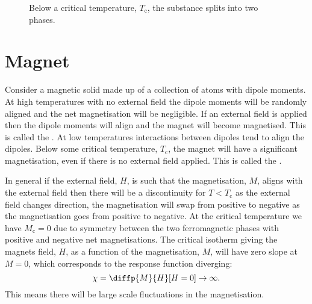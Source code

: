 \documentclass[fleqn]{NotesClass}
\begin{document}
    \begin{figure}
        \caption{Below a critical temperature, \(T_{\mathrm{c}}\), the substance splits into two phases.}
    \end{figure}
    
    \section{Magnet}
    Consider a magnetic solid made up of a collection of atoms with dipole moments.
    At high temperatures with no external field the dipole moments will be randomly aligned and the net magnetisation will be negligible.
    If an external field is applied then the dipole moments will align and the magnet will become magnetised.
    This is called the .
    At low temperatures interactions between dipoles tend to align the dipoles.
    Below some critical temperature, \(T_{\mathrm{c}}\), the magnet will have a significant magnetisation, even if there is no external field applied.
    This is called the .
    
    In general if the external field, \(H\), is such that the magnetisation, \(M\), aligns with the external field then there will be a discontinuity for \(T < T_{\mathrm{c}}\) as the external field changes direction, the magnetisation will swap from positive to negative as the magnetisation goes from positive to negative.
    At the critical temperature we have \(M_{\mathrm{c}} = 0\) due to symmetry between the two ferromagnetic phases with positive and negative net magnetisations.
    The critical isotherm giving the magnets field, \(H\), as a function of the magnetisation, \(M\), will have zero slope at \(M = 0\), which corresponds to the response function diverging:
    \begin{equation}
        \chi = \diffp{M}{H}[H = 0] \to \infty.
    \end{equation}
    This means there will be large scale fluctuations in the magnetisation.
    
\end{document}
